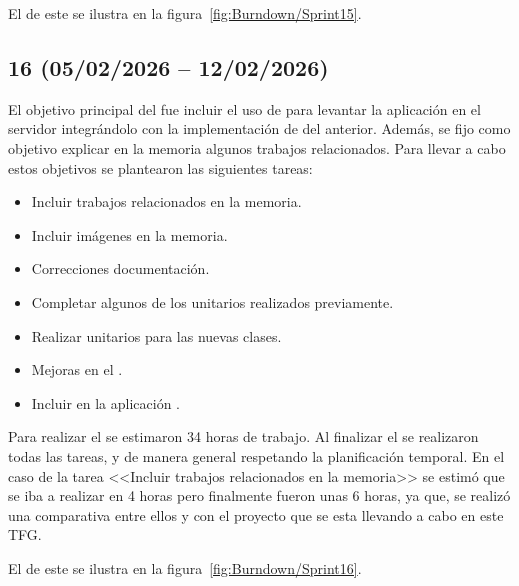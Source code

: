 El  de este  se ilustra en la figura~\ref{fig:Burndown/Sprint15}.

\subsection{ 16 (05/02/2026 -- 12/02/2026)}
El objetivo principal del  fue incluir el uso de  para levantar la aplicación  en el servidor integrándolo con la implementación de  del  anterior. Además, se fijo como objetivo explicar en la memoria algunos trabajos relacionados. Para llevar a cabo estos objetivos se plantearon las siguientes tareas:
\begin{itemize}
\tightlist
	\item Incluir trabajos relacionados en la memoria.
	\item Incluir imágenes en la memoria.
	\item Correcciones documentación.
	\item Completar algunos de los  unitarios realizados previamente.
	\item Realizar  unitarios para las nuevas clases.
	\item Mejoras en el .
	\item Incluir  en la aplicación .
\end{itemize}

Para realizar el  se estimaron 34 horas de trabajo. Al finalizar el  se realizaron todas las tareas, y de manera general respetando la planificación temporal. En el caso de la tarea <<Incluir trabajos relacionados en la memoria>> se estimó que se iba a realizar en 4 horas pero finalmente fueron unas 6 horas, ya que, se realizó una comparativa entre ellos y con el proyecto que se esta llevando a cabo en este TFG.

El  de este  se ilustra en la figura~\ref{fig:Burndown/Sprint16}.

